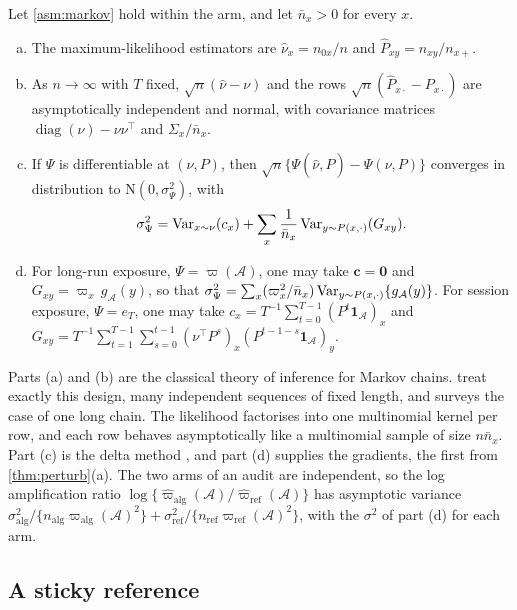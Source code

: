 \begin{proposition}[Estimation]\label{prop:markov-mle}
Let \cref{asm:markov} hold within the arm, and let $\bar n_x>0$ for every $x$.
\begin{enumerate}[(a)]
  \item The maximum-likelihood estimators are $\hat\nu_x=n_{0x}/n$ and $\hat P_{xy}=n_{xy}/n_{x+}$.
  \item As $n\to\infty$ with $T$ fixed, $\sqrt n(\hat\nu-\nu)$ and the rows $\sqrt n(\hat P_{x\cdot}-P_{x\cdot})$ are asymptotically independent and normal, with covariance matrices $\operatorname{diag}(\nu)-\nu\nu^{\top}$ and $\Sigma_x/\bar n_x$.
  \item If $\Psi$ is differentiable at $(\nu,P)$, then $\sqrt n\{\Psi(\hat\nu,\hat P)-\Psi(\nu,P)\}$ converges in distribution to $\mathrm N(0,\sigma^2_\Psi)$, with
  \[
    \sigma^2_\Psi=\operatorname{Var}_{x\sim\nu}(c_x)+\sum_x\frac{1}{\bar n_x}\operatorname{Var}_{y\sim P(x,\cdot)}(G_{xy}).
  \]
  \item For long-run exposure, $\Psi=\varpi(\mathcal A)$, one may take $\bm c=\bm0$ and $G_{xy}=\varpi_x\,g_{\mathcal A}(y)$, so that $\sigma^2_\Psi=\sum_x(\varpi_x^2/\bar n_x)\operatorname{Var}_{y\sim P(x,\cdot)}\{g_{\mathcal A}(y)\}$. For session exposure, $\Psi=e_T$, one may take $c_x=T^{-1}\sum_{t=0}^{T-1}(P^{t}\bm1_{\mathcal A})_x$ and $G_{xy}=T^{-1}\sum_{t=1}^{T-1}\sum_{s=0}^{t-1}(\nu^{\top}P^{s})_x(P^{t-1-s}\bm1_{\mathcal A})_y$.
\end{enumerate}
\end{proposition}

Parts (a) and (b) are the classical theory of inference for Markov chains.  treat exactly this design, many independent sequences of fixed length, and \citet{billingsley1961} surveys the case of one long chain. The likelihood factorises into one multinomial kernel per row, and each row behaves asymptotically like a multinomial sample of size $n\bar n_x$. Part (c) is the delta method \citep[Ch.~3]{vandervaart1998}, and part (d) supplies the gradients, the first from \cref{thm:perturb}(a). The two arms of an audit are independent, so the log amplification ratio $\log\{\hat\varpi_{\mathrm{alg}}(\mathcal A)/\hat\varpi_{\mathrm{ref}}(\mathcal A)\}$ has asymptotic variance $\sigma^2_{\mathrm{alg}}/\{n_{\mathrm{alg}}\varpi_{\mathrm{alg}}(\mathcal A)^2\}+\sigma^2_{\mathrm{ref}}/\{n_{\mathrm{ref}}\varpi_{\mathrm{ref}}(\mathcal A)^2\}$, with the $\sigma^2$ of part (d) for each arm.

\subsection{A sticky reference}\label{app:markov-nudge}

